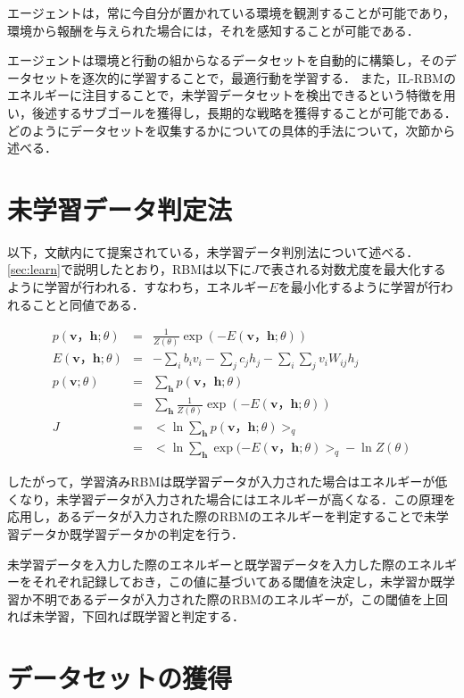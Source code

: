 エージェントは，常に今自分が置かれている環境を観測することが可能であり，環境から報酬を与えられた場合には，それを感知することが可能である．

エージェントは環境と行動の組からなるデータセットを自動的に構築し，そのデータセットを逐次的に学習することで，最適行動を学習する．
また，IL-RBMのエネルギーに注目することで，未学習データセットを検出できるという特徴を用い，後述するサブゴールを獲得し，長期的な戦略を獲得することが可能である．どのようにデータセットを収集するかについての具体的手法について，次節から述べる．

\section{未学習データ判定法}

以下，文献\cite{osawa}内にて提案されている，未学習データ判別法について述べる．\ref{sec:learn}で説明したとおり，RBMは以下に$J$で表される対数尤度を最大化するように学習が行われる．すなわち，エネルギー$E$を最小化するように学習が行われることと同値である．

\begin{eqnarray}
	p(\bm{v}， \bm{h}; \theta) & = & \frac{1}{Z(\theta)}  \exp (-E(\bm{v}，\bm{h};\theta)) \nonumber \\
	E(\bm{v}， \bm{h}; \theta) & = & -\sum_i b_i v_i - \sum_j c_j h_j- \sum_i \sum_j v_i W_{ij} h_j \nonumber \\
	p(\bm{v};\theta) & = & \sum_{\bm{h}} p(\bm{v}，\bm{h};\theta) \nonumber \\
			& = & \sum_{\bm{h}} \frac{1}{Z(\theta)} \exp (-E(\bm{v}， \bm{h}; \theta)) \nonumber \\
	J & = & < \ln \sum_{\bm{h}} p(\bm{v}， \bm{h}; \theta) >_q \nonumber \\
	  & = & < \ln \sum_{\bm{h}} \exp (-E(\bm{v}， \bm{h}; \theta) >_q - \ln Z(\theta) \nonumber 
\end{eqnarray}

したがって，学習済みRBMは既学習データが入力された場合はエネルギーが低くなり，未学習データが入力された場合にはエネルギーが高くなる．この原理を応用し，あるデータが入力された際のRBMのエネルギーを判定することで未学習データか既学習データかの判定を行う．

未学習データを入力した際のエネルギーと既学習データを入力した際のエネルギーをそれぞれ記録しておき，この値に基づいてある閾値を決定し，未学習か既学習か不明であるデータが入力された際のRBMのエネルギーが，この閾値を上回れば未学習，下回れば既学習と判定する．

\section{データセットの獲得}


